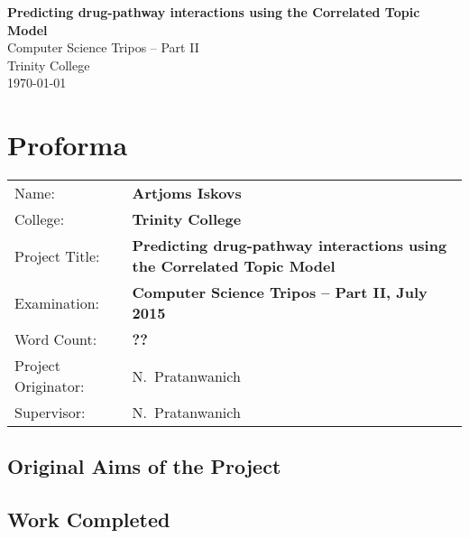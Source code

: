 \documentclass[12pt,a4paper,twoside,openright]{report}
\begin{document}





\pagestyle{empty}


\vspace*{60mm}
\begin{center}
\Huge
\textbf{Predicting drug-pathway interactions using the Correlated Topic Model} \\[5mm]
Computer Science Tripos -- Part II \\[5mm]
Trinity College \\[5mm]
\today  %
\end{center}


\pagestyle{plain}

\chapter*{Proforma}

{\large
\begin{tabular}{ll}
Name:               & \bf Artjoms Iskovs                       \\
College:            & \bf Trinity College                     \\
Project Title:     & \bf Predicting drug-pathway interactions using the Correlated Topic Model\\
Examination:        & \bf Computer Science Tripos -- Part II, July 2015  \\
Word Count:         & \bf ??\\
Project Originator: & N.~Pratanwanich                    \\
Supervisor:         & N.~Pratanwanich                    \\ 
\end{tabular}
}

\section*{Original Aims of the Project}


\section*{Work Completed}
\end{document}
